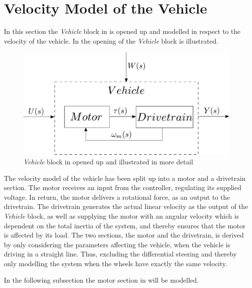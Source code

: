 \section{Velocity Model of the Vehicle}
In this section the \textit{Vehicle} block in   is opened up and modelled in respect to the velocity of the vehicle. In  the opening of the \textit{Vehicle} block is illustrated.

\begin{figure}[H]
	\centering
	\includegraphics[scale=0.6]{figures/plantopen.pdf}
	\caption{\textit{Vehicle} block in   opened up and illustrated in more detail}
	\label{fig:Velocitymodelplantopen}
\end{figure}

The velocity model of the vehicle has been split up into a motor and a drivetrain section. The motor receives an input from the controller, regulating its supplied voltage. In return, the motor delivers a rotational force, as an output to the drivetrain. The drivetrain generates the actual linear velocity as the output of the \textit{Vehicle} block, as well as supplying the motor with an angular velocity which is dependent on the total inertia of the system, and thereby ensures that the motor is affected by its load. The two sections, the motor and the drivetrain, is derived by only considering the parameters affecting the vehicle, when the vehicle is driving in a straight line. Thus, excluding the differential steering and thereby only modelling the system when the wheels have exactly the same velocity.

In the following subsection the motor section in  will be modelled.